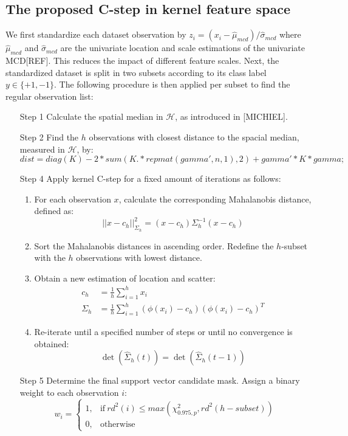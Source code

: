 \documentclass[preprint,12pt]{elsarticle}
\begin{document}
\subsection{The proposed C-step in kernel feature space}

We first standardize each dataset observation by $z_i = (x_i - \hat{\mu}_{mcd}) / \hat{\sigma}_{mcd}$ where $\hat{\mu}_{mcd}$ and $\hat{\sigma}_{mcd}$ are the univariate location and scale estimations of the univariate MCD[REF]. This reduces the impact of different feature scales. Next, the standardized dataset is split in two subsets according to its class label $y \in \{+1, -1\}$. The following procedure is then applied per subset to find the regular observation list:

\begin{itemize}
	\item [Step 1] Calculate the spatial median in $\mathcal{H}$, as introduced in [MICHIEL]. 
	\item [Step 2] Find the $h$ observations with closest distance to the spacial median, measured in  $\mathcal{H}$, by:
	\begin{equation}
		dist = diag(K) - 2*sum(K.*repmat(gamma',n,1),2) + gamma'*K*gamma;
	\end{equation} 
	\item [Step 4] Apply kernel C-step for a fixed amount of iterations as follows:
	\begin{enumerate}	
		\item For each observation $x$, calculate the corresponding Mahalanobis distance, defined as:
		\begin{equation}
		||x - c_h||^2_{\Sigma_h} = (x - c_h) \Sigma^{-1}_h (x - c_h)
		\end{equation}	
		\item Sort the Mahalanobis distances in ascending order. Redefine the $h$-subset with the $h$ observations with lowest distance. 
		\item Obtain a new estimation of location and scatter:
		\begin{align}
		c_h &= \frac{1}{h} \sum_{i=1}^{h}x_i \\
		\Sigma_h &= \frac{1}{h} \sum_{i=1}^{h} (\phi(x_i) - c_h) (\phi(x_i) - c_h)^T 
		\end{align}
		
		\item Re-iterate until a specified number of steps or until no convergence is obtained:
		\begin{equation}
		\det(\hat{\Sigma}_h(t))=\det(\hat{\Sigma}_h(t-1))
		\end{equation}
	\end{enumerate}
	\item [Step 5] Determine the final support vector candidate mask. Assign a binary weight to each observation $i$:
	\begin{equation}
	w_i =
	\begin{cases}
	1, & \text{if}\ rd^2(i) \leq max(\chi^2_{0.975, p}, rd^2(h-subset)) \\
	0, & \text{otherwise}
	\end{cases}
	\end{equation}
\end{itemize}
\end{document}
